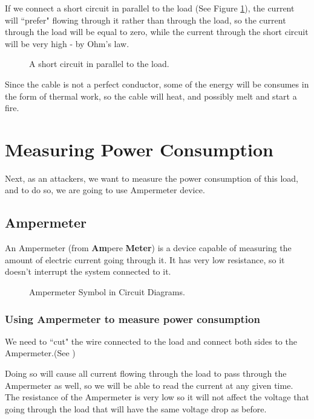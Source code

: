 If we connect a short circuit in parallel to the load (See Figure
\ref{fig:circuit4}), the current will ``prefer" flowing through it rather than
through the load, so the current through the load will be equal to zero, while
the current through the short circuit will be very high - by Ohm's law.

\begin{figure}[!ht]
    \centering
    
    \caption{A short circuit in parallel to the load.} \label{fig:circuit4}
\end{figure}

Since the cable is not a perfect conductor, some of the energy will be consumes
in the form of thermal work, so the cable will heat, and possibly melt and start
a fire.

\section{Measuring Power Consumption}

Next, as an attackers, we want to measure the power consumption of this load,
and to do so, we are going to use Ampermeter device.

\subsection{Ampermeter}

An Ampermeter (from \textbf{Am}pere \textbf{Meter}) is a device capable of
measuring the amount of electric current going through it. It has very low
resistance, so it doesn't interrupt the system connected to it.

\begin{figure}[!ht]
    \centering
    
    \caption{Ampermeter Symbol in Circuit Diagrams.} \label{fig:ampermeter}
\end{figure}

\subsubsection{Using Ampermeter to measure power consumption}

We need to ``cut" the wire connected to the load and connect both sides to the
Ampermeter.(See )

Doing so will cause all current flowing through the load to pass through the
Ampermeter as well, so we will be able to read the current at any given time.
The resistance of the Ampermeter is very low so it will not affect the voltage
that going through the load that will have the same voltage drop as before. 


